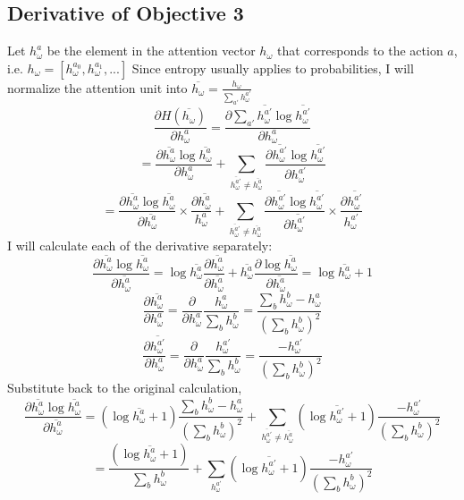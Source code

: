 \documentclass{article}
\begin{document}
	\subsection{Derivative of Objective 3}
	Let $h_\omega^a$ be the element in the attention vector $h_\omega$ that corresponds to the action $a$, i.e. $h_\omega = [h_\omega^{a_0}, h_\omega^{a_1}, ...]$
	Since entropy usually applies to probabilities, I will normalize the attention unit into $\overline{h_\omega} = \frac{h_\omega}{\sum_{a'} h_\omega^{a'}}$
	$$\frac{\partial H(\overline{h_\omega})}{\partial h_\omega^a} = \frac{\partial \sum_{a'} \overline{h_\omega^{a'}}\log \overline{h_\omega^{a'}}}{\partial h_\omega^a}$$
	$$= \frac{\partial \overline{h_\omega^a} \log \overline{h_\omega^a}}{\partial h_\omega^a} + \sum_{\overline{h_\omega^{a'}} \neq \overline{h_\omega^{a}}} \frac{\partial \overline{h_\omega^{a'}} \log \overline{h_\omega^{a'}}}{\partial h_\omega^{a'}}$$
	$$= \frac{\partial \overline{h_\omega^a} \log \overline{h_\omega^a}}{\partial \overline{h_\omega^{a}}} \times \frac{\partial \overline{h_\omega^a}}{h_\omega^a} + \sum_{\overline{h_\omega^{a'}} \neq \overline{h_\omega^{a}}} \frac{\partial \overline{h_\omega^{a'}} \log \overline{h_\omega^{a'}}}{\partial \overline{h_\omega^{a'}}} \times \frac{\partial \overline{h_\omega^{a'}}}{h_\omega^{a'}}$$
	I will calculate each of the derivative separately:
	$$\frac{\partial \overline{h_\omega^a} \log \overline{h_\omega^a}}{\partial \overline{h_\omega^{a}}} = \log \overline{h_\omega^a}\frac{\partial \overline{h_\omega^a}}{\partial \overline{h_\omega^{a}}} + \overline{h_\omega^a}\frac{\partial \log \overline{h_\omega^a}}{\partial \overline{h_\omega^{a}}} = \log \overline{h_\omega^a} + 1$$
	$$\frac{\partial \overline{h_{\omega}^a}}{\partial h_\omega^a} = \frac{\partial}{\partial h_\omega^a} \frac{h_\omega^a}{\sum_b h_\omega^b} = \frac{\sum_b h_\omega^b - h_\omega^a}{(\sum_{b} h_\omega^b)^2}$$
	$$\frac{\partial \overline{h_{\omega}^{a'}}}{\partial h_\omega^a} = \frac{\partial}{\partial h_\omega^a} \frac{h_\omega^{a'}}{\sum_b h_\omega^b} = \frac{- h_\omega^{a'}}{(\sum_b h_\omega^b)^2}$$
	Substitute back to the original calculation,
	$$\frac{\partial \overline{h_\omega^a} \log \overline{h_\omega^a}}{\partial \overline{h_\omega^{a}}} = (\log \overline{h_\omega^a} + 1)\frac{\sum_b h_\omega^b - h_\omega^a}{(\sum_{b} h_\omega^b)^2} + \sum_{\overline{h_\omega^{a'}} \neq \overline{h_\omega^{a}}} (\log \overline{h_\omega^{a'}} + 1)\frac{- h_\omega^{a'}}{(\sum_b h_\omega^b)^2}$$
	$$=\frac{(\log \overline{h_\omega^a} + 1)}{\sum_b h_\omega^b} + \sum_{h_\omega^{a'}} (\log \overline{h_\omega^{a'}} + 1)\frac{- h_\omega^{a'}}{(\sum_b h_\omega^b)^2}$$
\end{document}

